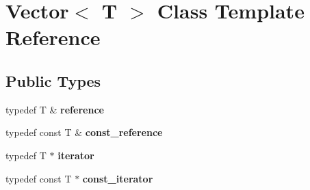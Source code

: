 \hypertarget{class_vector}{}\section{Vector$<$ T $>$ Class Template Reference}
\label{class_vector}
\subsection*{Public Types}
\begin{DoxyCompactItemize}
\item 
\mbox{\label{class_vector_aacab8f5d93fda39cbdf810e3440d1c29}} 
typedef T \& {\bfseries reference}
\item 
\mbox{\label{class_vector_a44d455da2c2c75f0ffda9856aa52308d}} 
typedef const T \& {\bfseries const\+\_\+reference}
\item 
\mbox{\label{class_vector_a30c203480dfd28a0f1fde5c08a68db94}} 
typedef T $\ast$ {\bfseries iterator}
\item 
\mbox{\label{class_vector_acbec6290edaeacd3b3b72f39bf910365}} 
typedef const T $\ast$ {\bfseries const\+\_\+iterator}
\end{DoxyCompactItemize}
